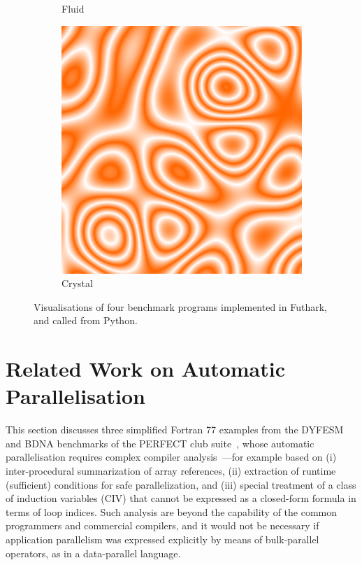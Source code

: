 \begin{figure}
\begin{subfigure}{0.24\textwidth}
    \caption{Fluid}
    \label{fig:fluid}
  \end{subfigure}
  \begin{subfigure}{0.24\textwidth}
    \includegraphics[width=\textwidth]{img/crystal.png}
    \caption{Crystal}
    \label{fig:crystal}
  \end{subfigure}

  \caption{Visualisations of four benchmark programs implemented in
    Futhark, and called from Python.}
  \label{fig:visualisations}
\end{figure}


\section{Related Work on Automatic Parallelisation}

This section discusses three simplified Fortran 77 examples from the
DYFESM and BDNA benchmarks of the PERFECT club
suite~\cite{Berry88theperfect}, whose automatic parallelisation
requires complex compiler
analysis~\cite{CosPLDI,CIVan,OanceaMon}---for example based on (i)
inter-procedural summarization of array references, (ii) extraction of
runtime (sufficient) conditions for safe parallelization, and (iii)
special treatment of a class of induction variables (CIV) that cannot
be expressed as a closed-form formula in terms of loop indices.
%
Such analysis are beyond the capability of the common programmers and
commercial compilers, and it would not be necessary if application
parallelism was expressed explicitly by means of bulk-parallel
operators, as in a data-parallel language.

